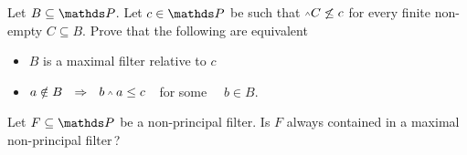 \begin{exercise}\label{ex_maximal_equivalent}
Let $B\subseteq \PP$.
Let $c\in \PP$ be such that $\swedge C\not\le c$ for every finite non-empty $C\subseteq B$.
Prove that the following are equivalent
\begin{itemize}
\item[1.] $B$ is a maximal filter relative to $c$
\item[2.] $a\notin B\ \ \IMP\ \ b\swedge a \le c$\ \  for some \ \ $b\in B$.
\end{itemize}
\end{exercise}


\begin{exercise}\label{maximal_nonprincipal}
Let $F\subseteq\PP$ be a non-principal filter.
Is $F$ always contained in a maximal non-principal filter\,?
\end{exercise}



